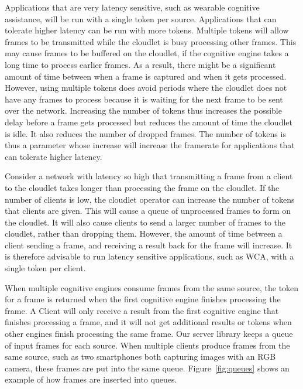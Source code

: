 Applications that are very latency sensitive, such as
wearable cognitive assistance, will be run with a single token per source.
Applications that can tolerate higher latency can be run with more tokens.
Multiple tokens will allow frames to be transmitted while the cloudlet is busy
processing other frames.
This may cause frames to be buffered on the cloudlet, if the cognitive engine
takes a long time to process earlier frames.
As a result, there might be a significant amount of time between when a frame is
captured and when it gets processed.
However, using multiple tokens does avoid periods where the
cloudlet does not have any frames to process because it is waiting for the next
frame to be sent over the network.
Increasing the number of tokens thus increases the possible delay before a frame
gets processed but reduces the amount of time the cloudlet is idle.
It also reduces the number of dropped frames.
The number of tokens is thus a parameter whose increase will increase the
framerate for applications that can tolerate higher latency.

Consider a network with latency so high that transmitting a frame from a client
to the cloudlet takes longer than processing the frame on the cloudlet.
If the number of clients is low, the cloudlet operator can increase the number
of tokens that clients are given.
This will cause a queue of unprocessed frames to form on the cloudlet.
It will also cause clients to send a larger number of frames to the cloudlet,
rather than dropping them.
However, the amount of time between a client sending a frame, and receiving a
result back for the frame will increase.
It is therefore advisable to run latency sensitive applications, such as WCA,
with a single token per client.

When multiple cognitive engines consume frames from the same source, the token
for a frame is returned when the first cognitive engine finishes processing the
frame.
A Client will only receive a result from the first cognitive engine that
finishes processing a frame, and it will not get additional results or tokens
when other engines finish processing the same frame. Our server library keeps a
queue of input frames for each source. When multiple clients produce frames from
the same source, such as two smartphones both capturing images with an RGB
camera, these frames are put into the same queue.
Figure~\ref{fig:queues} shows an example of how frames are inserted into queues.


